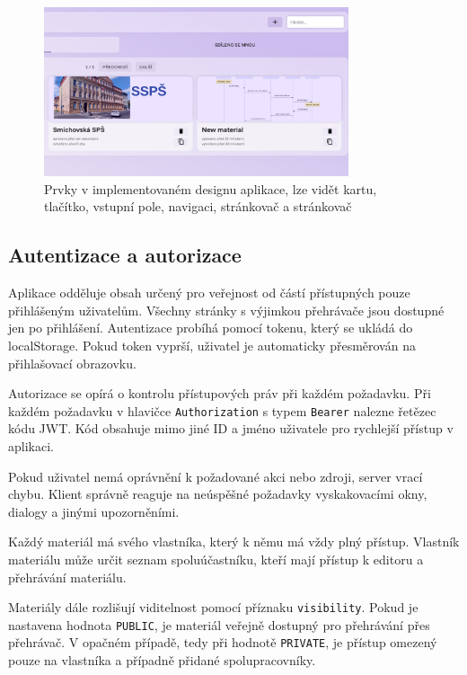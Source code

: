 \begin{figure}[ht!]
    \centering
    \includegraphics[width=0.8\textwidth]{media/05_realizace/design.png}
    \caption[Prvky v implementovaném designu aplikace]{Prvky v implementovaném designu aplikace, lze vidět kartu, tlačítko, vstupní pole, navigaci, stránkovač a stránkovač}
    \label{fig:realizace/design}
\end{figure}


\subsection{Autentizace a autorizace}

Aplikace odděluje obsah určený pro veřejnost od částí přístupných pouze přihlášeným uživatelům. 
Všechny stránky s výjimkou přehrávače jsou dostupné jen po přihlášení. 
Autentizace probíhá pomocí tokenu, který se ukládá do localStorage. 
Pokud token vyprší, uživatel je automaticky přesměrován na přihlašovací obrazovku.

Autorizace se opírá o kontrolu přístupových práv při každém požadavku. 
Při každém požadavku v hlavičce \texttt{Authorization} s typem \texttt{Bearer} nalezne řetězec kódu JWT.
Kód obsahuje mimo jiné ID a jméno uživatele pro rychlejší přístup v aplikaci.

Pokud uživatel nemá oprávnění k požadované akci nebo zdroji, server vrací chybu. 
Klient správně reaguje na neúspěšné požadavky vyskakovacími okny, dialogy a jinými upozorněními.

Každý materiál má svého vlastníka, který k němu má vždy plný přístup. 
Vlastník materiálu může určit seznam spoluúčastníku, kteří mají přístup k editoru a přehrávání materiálu.

Materiály dále rozlišují viditelnost pomocí příznaku \texttt{visibility}. 
Pokud je nastavena hodnota \texttt{PUBLIC}, je materiál veřejně dostupný pro přehrávání přes přehrávač. 
V opačném případě, tedy při hodnotě \texttt{PRIVATE}, je přístup omezený pouze na vlastníka a případně přidané spolupracovníky.


